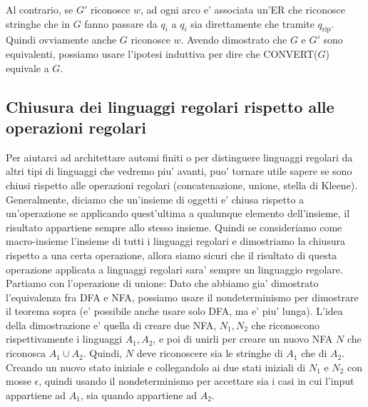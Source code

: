 {\begin{itemize}
      Al contrario, se $ G' $ riconosce $ w $, ad ogni arco e' associata un'ER che riconosce stringhe che in $ G $ fanno passare da $ q_i $ a $ q_i $ sia direttamente che tramite $ q_{\text{rip}} $. Quindi ovviamente anche $ G $ riconosce $ w $. Avendo dimostrato che $ G $ e $ G' $ sono equivalenti, possiamo usare l'ipotesi induttiva per dire che CONVERT($ G $) equivale a $ G $.
  \end{itemize}
}


\subsection{Chiusura dei linguaggi regolari rispetto alle operazioni regolari}
Per aiutarci ad architettare automi finiti o per distinguere linguaggi regolari da altri tipi di linguaggi che vedremo piu' avanti, puo' tornare utile sapere se sono chiusi rispetto alle operazioni regolari (concatenazione, unione, stella di Kleene). Generalmente, diciamo che un'insieme di oggetti e' chiusa rispetto a un'operazione se applicando quest'ultima a qualunque elemento dell'insieme, il risultato appartiene sempre allo stesso insieme. Quindi se consideriamo come macro-insieme l'insieme di tutti i linguaggi regolari e dimostriamo la chiusura rispetto a una certa operazione, allora siamo sicuri che il risultato di questa operazione applicata a linguaggi regolari sara' sempre un linguaggio regolare. Partiamo con l'operazione di unione:
Dato che abbiamo gia' dimostrato l'equivalenza fra DFA e NFA, possiamo usare il nondeterminismo per dimostrare il teorema sopra (e' possibile anche usare solo DFA, ma e' piu' lunga). L'idea della dimostrazione e' quella di creare due NFA, $ N_1, N_2 $ che riconoscono rispettivamente i linguaggi $ A_1, A_2 $, e poi di unirli per creare un nuovo NFA $ N $ che riconosca $ A_1 \cup A_2 $. Quindi, $ N $ deve riconoscere sia le stringhe di $ A_1 $ che di $ A_2 $. Creando un nuovo stato iniziale e collegandolo ai due stati iniziali di $ N_1 $ e $ N_2 $ con mosse $ \epsilon $, quindi usando il nondeterminismo per accettare sia i casi in cui l'input appartiene ad $ A_1 $, sia quando appartiene ad $ A_2 $. 
